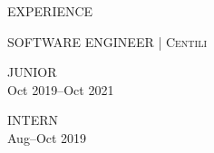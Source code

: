 \begin{minipage}[t]{\linewidth}\vspace{\sectionTopmargin}
{\titleFont\light EXPERIENCE}\linebreak

\vspace{\titleBottomMargin}
{\subtitleFont\bold SOFTWARE ENGINEER \extraLight\scshape | Centili}\newline
\vfill\vspace{\dateTopMargin}{\dateFont\extraLight Aug 2019--present\alignRight}\linebreak\newline

\vspace{\twoColMiniSubtitleTopMargin}
\begin{minipage}[t]{0.6\linewidth}
{\miniSubtitleFont\bold JUNIOR\\\miniDateFont\extraLight Oct 2019--Oct 2021 }
\end{minipage}
\begin{minipage}[t]{0.4\linewidth}
{\miniSubtitleFont\bold INTERN\\\miniDateFont\extraLight Aug--Oct 2019 }
\end{minipage}\newline


\end{minipage}
